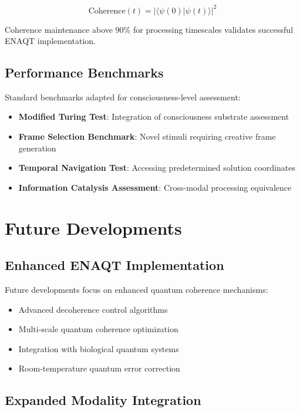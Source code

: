 \documentclass[12pt,a4paper]{article}
\theoremstyle{remark}
\begin{document}
\begin{equation}
\text{Coherence}(t) = |\langle\psi(0)|\psi(t)\rangle|^2
\end{equation}

Coherence maintenance above 90\% for processing timescales validates successful ENAQT implementation.

\subsection{Performance Benchmarks}

Standard benchmarks adapted for consciousness-level assessment:

\begin{itemize}
\item \textbf{Modified Turing Test}: Integration of consciousness substrate assessment
\item \textbf{Frame Selection Benchmark}: Novel stimuli requiring creative frame generation
\item \textbf{Temporal Navigation Test}: Accessing predetermined solution coordinates
\item \textbf{Information Catalysis Assessment}: Cross-modal processing equivalence
\end{itemize}

\section{Future Developments}

\subsection{Enhanced ENAQT Implementation}

Future developments focus on enhanced quantum coherence mechanisms:

\begin{itemize}
\item Advanced decoherence control algorithms
\item Multi-scale quantum coherence optimization
\item Integration with biological quantum systems
\item Room-temperature quantum error correction
\end{itemize}

\subsection{Expanded Modality Integration}
\end{document}
